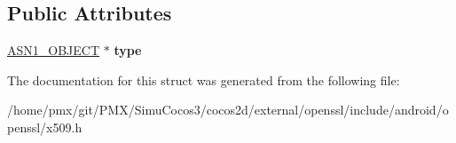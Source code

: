 \subsection*{Public Attributes}
\begin{DoxyCompactItemize}
\item 
\mbox{\label{structNetscape__certificate__sequence_a9d1f4123e3491e17309413fe1d775e7b}} 
\hyperlink{structasn1__object__st}{A\+S\+N1\+\_\+\+O\+B\+J\+E\+CT} $\ast$ {\bfseries type}
\end{DoxyCompactItemize}


The documentation for this struct was generated from the following file\+:\begin{DoxyCompactItemize}
\item 
/home/pmx/git/\+P\+M\+X/\+Simu\+Cocos3/cocos2d/external/openssl/include/android/openssl/x509.\+h\end{DoxyCompactItemize}
